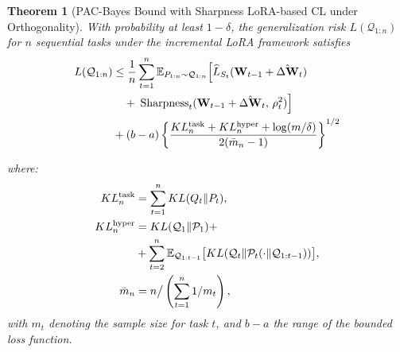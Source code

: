 \documentclass[letterpaper]{article} %
\newtheorem{theorem}{Theorem}
\begin{document}
\begin{theorem}[PAC-Bayes Bound with Sharpness LoRA-based CL under Orthogonality]
With probability at least $1-\delta$, the generalization risk $L(\mathcal{Q}_{1:n})$ for $n$ sequential tasks under the incremental LoRA framework satisfies
\begin{align}
L(\mathcal{Q}_{1:n}) &\leq \frac{1}{n} \sum_{t=1}^n 
    \mathbb{E}_{P_{1:n} \sim \mathcal{Q}_{1:n}}
    \Big[
        \widehat{L}_{S_t}(\mathbf{W}_{t-1} + \hat{\Delta\mathbf{W}}_t)
    \notag \\
&\quad +\; \mathrm{Sharpness}_t(\mathbf{W}_{t-1} + \hat{\Delta\mathbf{W}}_t,\, \rho_t^2)
    \Big] 
    \notag \\
& + (b-a) \left\{ 
    \frac{KL_n^{\text{task}} + KL_n^{\text{hyper}} + \log(m/\delta)}
         {2(\bar{m}_n - 1)}
\right\}^{1/2}
\label{eq:lora-pac-bayes-bound}
\end{align}

where:
\begin{align}
KL_n^{\mathrm{task}} &= \sum_{t=1}^n KL(Q_t\|P_t), \notag  \\
KL_n^{\mathrm{hyper}} &= KL(\mathcal{Q}_1 \| \mathcal{P}_1) +  \\ &+\sum_{t=2}^n \mathbb{E}_{\mathcal{Q}_{1:t-1}}\big[KL(\mathcal{Q}_t \| \mathcal{P}_t(\cdot \| \mathcal{Q}_{1:t-1}))\big], \notag\\
\bar{m}_n &= n \big/ \left(\sum_{t=1}^n 1/m_t\right), \notag
\end{align}
with $m_t$ denoting the sample size for task $t$, and $b-a$ the range of the bounded loss function.
\end{theorem}
\end{document}
